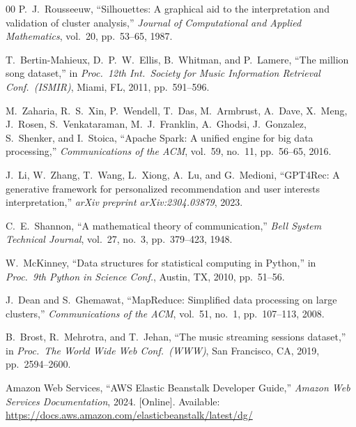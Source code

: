 \documentclass[conference]{IEEEtran}
\begin{document}
\begin{thebibliography}{00}
P.~J.~Rousseeuw, ``Silhouettes: A graphical aid to the interpretation and
validation of cluster analysis,'' \textit{Journal of Computational and
Applied Mathematics}, vol.~20, pp.~53--65, 1987.

T.~Bertin-Mahieux, D.~P.~W.~Ellis, B.~Whitman, and P.~Lamere, ``The million
song dataset,'' in \textit{Proc.\ 12th Int.\ Society for Music Information
Retrieval Conf.\ (ISMIR)}, Miami, FL, 2011, pp.~591--596.

M.~Zaharia, R.~S.~Xin, P.~Wendell, T.~Das, M.~Armbrust, A.~Dave,
X.~Meng, J.~Rosen, S.~Venkataraman, M.~J.~Franklin, A.~Ghodsi,
J.~Gonzalez, S.~Shenker, and I.~Stoica, ``Apache Spark: A unified engine
for big data processing,'' \textit{Communications of the ACM}, vol.~59,
no.~11, pp.~56--65, 2016.

J.~Li, W.~Zhang, T.~Wang, L.~Xiong, A.~Lu, and G.~Medioni, ``GPT4Rec:
A generative framework for personalized recommendation and user interests
interpretation,'' \textit{arXiv preprint arXiv:2304.03879}, 2023.

C.~E.~Shannon, ``A mathematical theory of communication,''
\textit{Bell System Technical Journal}, vol.~27, no.~3, pp.~379--423, 1948.

W.~McKinney, ``Data structures for statistical computing in Python,''
in \textit{Proc.\ 9th Python in Science Conf.}, Austin, TX, 2010,
pp.~51--56.

J.~Dean and S.~Ghemawat, ``MapReduce: Simplified data processing on large
clusters,'' \textit{Communications of the ACM}, vol.~51, no.~1,
pp.~107--113, 2008.

B.~Brost, R.~Mehrotra, and T.~Jehan, ``The music streaming sessions dataset,''
in \textit{Proc.\ The World Wide Web Conf.\ (WWW)}, San Francisco, CA, 2019,
pp.~2594--2600.

Amazon Web Services, ``AWS Elastic Beanstalk Developer Guide,''
\textit{Amazon Web Services Documentation}, 2024. [Online]. Available:
\url{https://docs.aws.amazon.com/elasticbeanstalk/latest/dg/}

\end{thebibliography}
\end{document}
